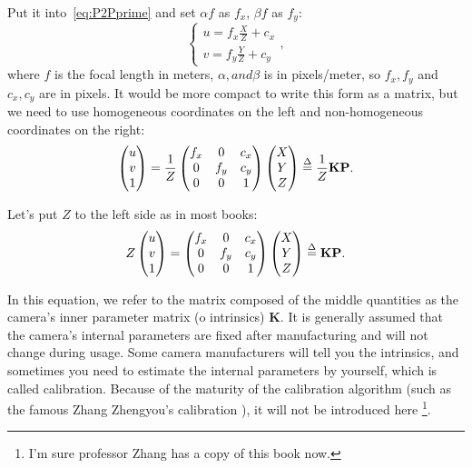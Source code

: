 Put it into~\eqref{eq:P2Pprime} and set $\alpha f$ as $f_x$, $\beta f$ as $f_y$:
\begin{equation}
\left\{
\begin{matrix} 
u=f_x\frac{X}{Z} + c_x\\ 
v=f_y\frac{Y}{Z} + c_y
\end{matrix}
\right. ,
\end{equation}
where $f$ is the focal length in meters, $\alpha, and \beta$ is in pixels/meter, so $f_x, f_y$ and $c_x, c_y$ are in pixels. It would be more compact to write this form as a matrix, but we need to use homogeneous coordinates on the left and non-homogeneous coordinates on the right:
\begin{equation}
\label{eq:intrinmatrix} 
\begin{pmatrix} u\\ v\\ 1 \end{pmatrix}=\frac{1}{Z}\begin{pmatrix} f_x & 0&c_x \\ 0& f_y& c_y\\ 0&0 & 1 \end{pmatrix}\begin{pmatrix} X\\ Y\\ Z \end{pmatrix} 
\buildrel \Delta \over =\frac{1}{Z} \mathbf{K} \mathbf{P}.
\end{equation}

Let's put $Z$ to the left side as in most books:
\begin{equation}
Z \begin{pmatrix} u\\ v\\ 1 \end{pmatrix}= \begin{pmatrix} f_x & 0&c_x \\ 0& f_y& c_y\\ 0&0 & 1 \end{pmatrix}\begin{pmatrix} X\\ Y\\ Z \end{pmatrix} 
\buildrel \Delta \over = \mathbf{K} \mathbf{P}.
\end{equation}

In this equation, we refer to the matrix composed of the middle quantities as the camera's inner parameter matrix (o intrinsics) $\mathbf{K}$. It is generally assumed that the camera's internal parameters are fixed after manufacturing and will not change during usage. Some camera manufacturers will tell you the intrinsics, and sometimes you need to estimate the internal parameters by yourself, which is called calibration. Because of the maturity of the calibration algorithm (such as the famous Zhang Zhengyou's calibration {\cite{Zhang1999}}), it will not be introduced here \footnote{I'm sure professor Zhang has a copy of this book now.}. 

